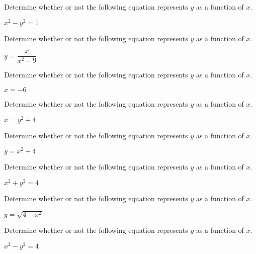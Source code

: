 \documentclass{ximera}
\begin{document}

\begin{problem}
Determine whether or not the following equation represents $y$ as a function of $x$.

$x^{2} - y^{2} = 1$ 
\end{problem}


\begin{problem}
Determine whether or not the following equation represents $y$ as a function of $x$.

$y = \dfrac{x}{x^{2} - 9}$ 
\end{problem}


\begin{problem}
Determine whether or not the following equation represents $y$ as a function of $x$.

$x = -6$
\end{problem}



\begin{problem}
Determine whether or not the following equation represents $y$ as a function of $x$.

$x = y^2 + 4$
\end{problem}  

\begin{problem}
Determine whether or not the following equation represents $y$ as a function of $x$.

$y = x^2 + 4$
\end{problem} 

\begin{problem}
Determine whether or not the following equation represents $y$ as a function of $x$.

$x^2 + y^2 = 4$
\end{problem}




\begin{problem}
Determine whether or not the following equation represents $y$ as a function of $x$.

$y = \sqrt{4-x^2}$
\end{problem} 

\begin{problem}
Determine whether or not the following equation represents $y$ as a function of $x$.

$x^2 - y^2 = 4$
\end{problem}
\end{document}
